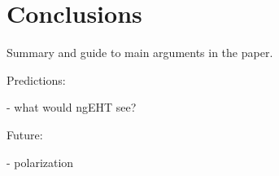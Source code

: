 \section{Conclusions}\label{sec:conclusions}

Summary and guide to main arguments in the paper.


Predictions:

- what would ngEHT see?

Future:

- polarization
